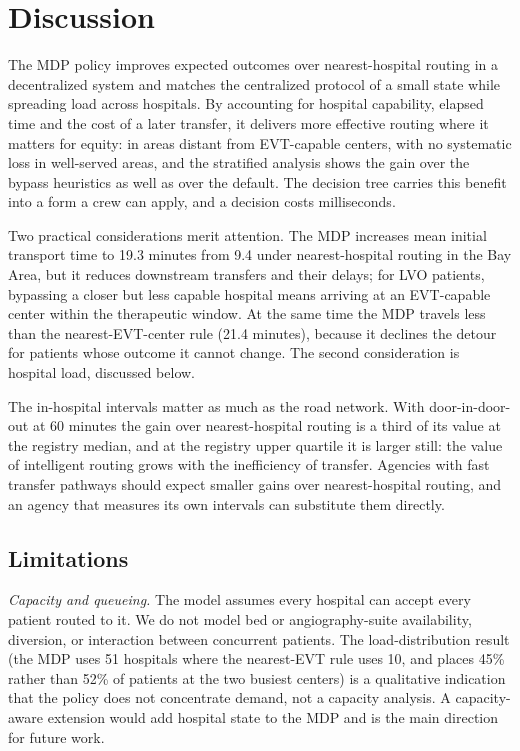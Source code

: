 \section{Discussion}
\label{sec:discussion}

The MDP policy improves expected outcomes over nearest-hospital routing in a decentralized system and matches the centralized protocol of a small state while spreading load across hospitals. By accounting for hospital capability, elapsed time and the cost of a later transfer, it delivers more effective routing where it matters for equity: in areas distant from EVT-capable centers, with no systematic loss in well-served areas, and the stratified analysis shows the gain over the bypass heuristics as well as over the default. The decision tree carries this benefit into a form a crew can apply, and a decision costs milliseconds.

Two practical considerations merit attention. The MDP increases mean initial transport time to 19.3 minutes from 9.4 under nearest-hospital routing in the Bay Area, but it reduces downstream transfers and their delays; for LVO patients, bypassing a closer but less capable hospital means arriving at an EVT-capable center within the therapeutic window. At the same time the MDP travels less than the nearest-EVT-center rule (21.4 minutes), because it declines the detour for patients whose outcome it cannot change. The second consideration is hospital load, discussed below.

The in-hospital intervals matter as much as the road network. With door-in-door-out at 60 minutes the gain over nearest-hospital routing is a third of its value at the registry median, and at the registry upper quartile it is larger still: the value of intelligent routing grows with the inefficiency of transfer. Agencies with fast transfer pathways should expect smaller gains over nearest-hospital routing, and an agency that measures its own intervals can substitute them directly.

\subsection{Limitations}
\emph{Capacity and queueing.} The model assumes every hospital can accept every patient routed to it. We do not model bed or angiography-suite availability, diversion, or interaction between concurrent patients. The load-distribution result (the MDP uses 51 hospitals where the nearest-EVT rule uses 10, and places 45\% rather than 52\% of patients at the two busiest centers) is a qualitative indication that the policy does not concentrate demand, not a capacity analysis. A capacity-aware extension would add hospital state to the MDP and is the main direction for future work.

